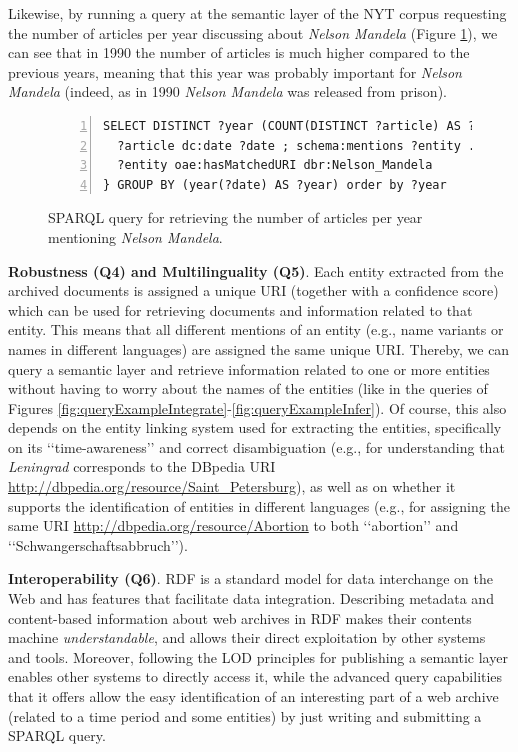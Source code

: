 \documentclass{libtex/sig-alternate-05-2015}
\newcommand{\q}[1]{\lq\lq{}{}#1\rq\rq{}{}}
\begin{document}
Likewise, by running a query at the semantic layer of the NYT corpus
requesting the number of articles per year discussing
about {\em Nelson Mandela} (Figure \ref{fig:queryExampleInferMand}),
we can see that in 1990 the number of articles is much higher compared
to the previous years, meaning that this year was probably important
for {\em Nelson Mandela} (indeed, as in
1990 {\em Nelson Mandela} was released from prison).
\begin{figure}[th]
\vspace{-2mm}
\centering \scriptsize
\begin{Verbatim}[frame=lines,numbers=left,numbersep=1pt]
SELECT DISTINCT ?year (COUNT(DISTINCT ?article) AS ?num) WHERE {
  ?article dc:date ?date ; schema:mentions ?entity .
  ?entity oae:hasMatchedURI dbr:Nelson_Mandela
} GROUP BY (year(?date) AS ?year) order by ?year
\end{Verbatim}
\vspace{-6mm}
\caption{SPARQL query for retrieving the number of articles per
year mentioning {\em Nelson Mandela}.}
\label{fig:queryExampleInferMand}
\vspace{-2mm}
\end{figure}


\vspace{1mm} \noindent
{\bf Robustness (Q4) and Multilinguality (Q5)}.
Each entity extracted from the archived documents
is assigned a unique URI (together with a confidence score)
which can be used for retrieving documents and information related to that entity.
This means that all different mentions of an entity
(e.g., name variants or names in different languages) are assigned the
same unique URI.
Thereby, we can query a semantic layer and retrieve information
related to one or more entities without having to worry
about the names of the entities (like in the queries
of Figures \ref{fig:queryExampleIntegrate}-\ref{fig:queryExampleInfer}).
Of course, this also depends on the entity linking
system used for extracting the entities, specifically
on its \q{time-awareness} and correct disambiguation
(e.g., for understanding that {\em Leningrad} corresponds to the DBpedia URI
\url{http://dbpedia.org/resource/Saint_Petersburg}), as well as on
whether it supports
the identification of entities in different languages
(e.g., for assigning the same URI \url{http://dbpedia.org/resource/Abortion} to
both \q{abortion} and \q{Sch\-wa\-nger\-schaft\-sabbruch}).

\vspace{1mm} \noindent
{\bf Interoperability (Q6)}.
RDF is a standard model for data interchange on the Web
and has features that facilitate data integration. %
Describing metadata and content-based information about web archives in RDF
makes their contents machine {\em understandable}, and
allows their direct exploitation by other systems and tools.
Moreover, following the LOD principles for publishing a semantic layer
enables other systems to directly access it,
while the advanced query capabilities that it offers
allow the easy identification of an interesting part of a web archive
(related to a time period and some entities)
by just writing and submitting a SPARQL query.
\end{document}
